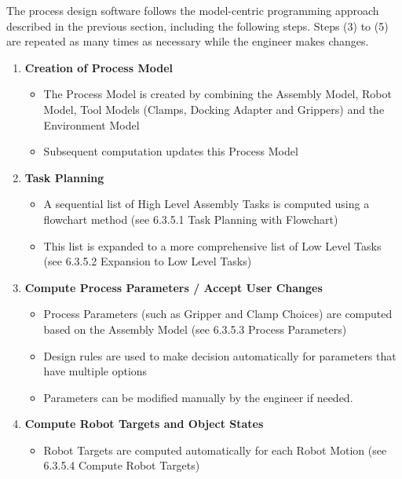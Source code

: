 The process design software follows the model-centric programming approach described in the previous section, including the following steps. Steps (3) to (5) are repeated as many times as necessary while the engineer makes changes.
\begin{enumerate}
\item \textbf{Creation of Process Model}

\begin{itemize}
	\item The Process Model is created by combining the Assembly Model, Robot Model, Tool Models (Clamps, Docking Adapter and Grippers) and the Environment Model 

	\item Subsequent computation updates this Process Model

\end{itemize}

\item \textbf{Task Planning}

\begin{itemize}
	\item A sequential list of High Level Assembly Tasks is computed using a flowchart method (see 6.3.5.1 Task Planning with Flowchart)

	\item This list is expanded to a more comprehensive list of Low Level Tasks (see 6.3.5.2 Expansion to Low Level Tasks)

\end{itemize}
	\item \textbf{Compute Process Parameters / Accept User Changes}

\begin{itemize}
	\item Process Parameters (such as Gripper and Clamp Choices) are computed based on the Assembly Model (see 6.3.5.3 Process Parameters)

	\item Design rules are used to make decision automatically for parameters that have multiple options

	\item Parameters can be modified manually by the engineer if needed.

\end{itemize}
	\item \textbf{Compute Robot Targets and Object States}

\begin{itemize}
	\item Robot Targets are computed automatically for each Robot Motion (see 6.3.5.4 Compute Robot Targets)


\end{itemize}
\end{enumerate}

